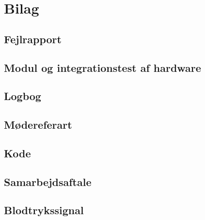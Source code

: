 \chapter{Bilag}
\section{Fejlrapport}
\label{Fejlrapport}

\section{Modul og integrationstest af hardware}\label{Modul og integration}

\section{Logbog}\label{Logbog}

\section{Mødereferart}\label{Moedereferart}

\section{Kode}\label{Kode}

\section{Samarbejdsaftale}\label{Samarbejdsaftale}

\section{Blodtrykssignal}\label{blodtrykssignal}

